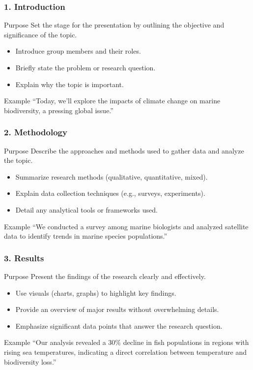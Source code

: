 \documentclass[aspectratio=169]{beamer}
\begin{document}
\begin{frame}[fragile]
    \frametitle{1. Introduction}
    \begin{block}{Purpose}
        Set the stage for the presentation by outlining the objective and significance of the topic.
    \end{block}
    \begin{itemize}
        \item Introduce group members and their roles.
        \item Briefly state the problem or research question.
        \item Explain why the topic is important.
    \end{itemize}
    \begin{block}{Example}
        “Today, we’ll explore the impacts of climate change on marine biodiversity, a pressing global issue.”
    \end{block}
\end{frame}

\begin{frame}[fragile]
    \frametitle{2. Methodology}
    \begin{block}{Purpose}
        Describe the approaches and methods used to gather data and analyze the topic.
    \end{block}
    \begin{itemize}
        \item Summarize research methods (qualitative, quantitative, mixed).
        \item Explain data collection techniques (e.g., surveys, experiments).
        \item Detail any analytical tools or frameworks used.
    \end{itemize}
    \begin{block}{Example}
        “We conducted a survey among marine biologists and analyzed satellite data to identify trends in marine species populations.”
    \end{block}
\end{frame}

\begin{frame}[fragile]
    \frametitle{3. Results}
    \begin{block}{Purpose}
        Present the findings of the research clearly and effectively.
    \end{block}
    \begin{itemize}
        \item Use visuals (charts, graphs) to highlight key findings.
        \item Provide an overview of major results without overwhelming details.
        \item Emphasize significant data points that answer the research question.
    \end{itemize}
    \begin{block}{Example}
        “Our analysis revealed a 30\% decline in fish populations in regions with rising sea temperatures, indicating a direct correlation between temperature and biodiversity loss.”
    \end{block}
\end{frame}
\end{document}
